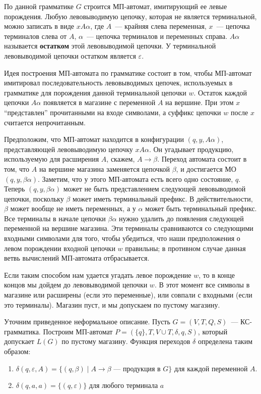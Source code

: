 \documentclass[a4paper,12pt]{article}
\begin{document}
По данной грамматике \(G\) строится МП-автомат, имитирующий ее левые порождения. Любую левовыводимую цепочку, которая не является терминальной, можно записать в виде \(xA\alpha\), где \(A\)~--- крайняя слева переменная, \(x\)~--- цепочка терминалов слева от \(A\), \(\alpha\)~--- цепочка терминалов и переменных справа. \(A\alpha\) называется \textbf{остатком} этой левовыводимой цепочки. У терминальной левовыводимой цепочки остатком является \(\varepsilon\).

Идея построения МП-автомата по грамматике состоит в том, чтобы МП-автомат имитировал последовательность левовыводимых цепочек, используемых в грамматике для порождения данной терминальной цепочки \(w\). Остаток каждой цепочки \(A\alpha\) появляется в магазине с переменной \(A\) на вершине. При этом \(x\) “представлен” прочитанными на входе символами, а суффикс цепочки \(w\) после \(x\) считается непрочитанным.

Предположим, что МП-автомат находится в конфигурации \((q, y, A\alpha)\), представляющей левовыводимую цепочку \(xA\alpha\). Он угадывает продукцию, используемую для расширения \(A\), скажем, \(A \to \beta\). Переход автомата состоит в том, что \(A\) на вершине магазина заменяется цепочкой \(\beta\), и достигается МО \((q, y, \beta\alpha)\). Заметим, что у этого МП-автомата есть всего одно состояние, \(q\). Теперь \((q, y, \beta\alpha)\) может не быть представлением следующей левовыводимой цепочки, поскольку \(\beta\) может иметь терминальный префикс. В действительности, \(\beta\) может вообще не иметь переменных, а у \(\alpha\) может быть терминальный префикс. Все терминалы в начале цепочки \(\beta\alpha\) нужно удалить до появления следующей переменной на вершине магазина. Эти терминалы сравниваются со следующими входными символами для того, чтобы убедиться, что наши предположения о левом порождении входной цепочки \(w\) правильны; в противном случае данная ветвь вычислений МП-автомата отбрасывается.

Если таким способом нам удается угадать левое порождение \(w\), то в конце концов мы дойдем до левовыводимой цепочки \(w\). В этот момент все символы в магазине или расширены (если это переменные), или совпали с входными (если это терминалы). Магазин пуст, и мы допускаем по пустому магазину.

Уточним приведенное неформальное описание. Пусть \(G = (V, T, Q, S)\)~--- КС-грамматика. Построим МП-автомат \(P = (\{q\}, T, V \cup T, \delta, q, S)\), который допускает \(L(G)\) по пустому магазину. Функция переходов \(\delta\) определена таким образом:
\begin{enumerate}
	\item \(\delta(q, \varepsilon, A) = \{(q, \beta) \mid A \to \beta\text{~--- продукция в }G\}\) для каждой переменной \(A\).
	\item \(\delta(q, a, a) = \{(q, \varepsilon)\}\) для любого терминала \(a\)
\end{enumerate}
\end{document}
